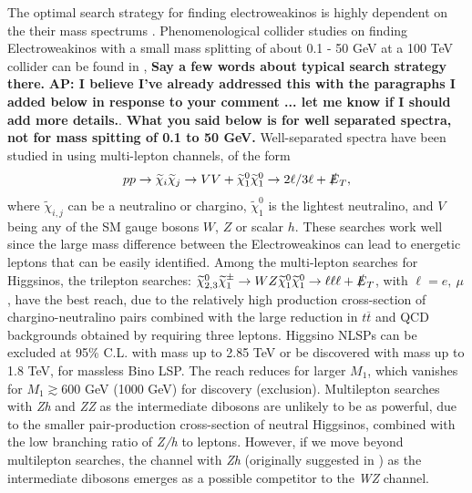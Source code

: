 \documentclass[a4paper,11pt]{article}
\newcommand{\Shufang}[1]{{\bf\color{Maroon}  #1}}
\newcommand{\Adarsh}[1]{{\bf\color{RoyalBlue} AP: #1}}
\newcommand{\met}{{\slashed{E}_T}}
\begin{document}
The optimal search strategy for finding electroweakinos is highly dependent on
the their mass spectrums \citep{Han:2013kza}.  Phenomenological collider studies on finding
Electroweakinos with a small mass splitting of about 0.1 - 50 GeV at a 100 TeV collider can be
found in \citep{Low:2014cba, Bramante:2014tba, Berlin:2015aba, Cirelli:2014dsa},
\Shufang{Say a few words about typical search strategy there.} \Adarsh{I
believe I've already addressed this with the paragraphs I added below in response
to your comment ... let me know if I should add more details.}. \Shufang{What you said below is for well separated spectra, not for mass spitting of 0.1 to 50 GeV.}
Well-separated spectra have been studied in \citep{Gori:2014oua,
Acharya:2014pua} using
multi-lepton channels, of the form 
\begin{align}
  pp\rightarrow \widetilde{\chi}_i\widetilde{\chi}_j\rightarrow VV +
  \widetilde{\chi}_1^0\widetilde{\chi}_1^0\rightarrow 2\ell/3\ell +  
  \met,
\end{align}
where $\widetilde{\chi}_{i,j}$ can be a neutralino or chargino,
$\widetilde{\chi}_1^0$ is the lightest neutralino, and $V$ being any of the SM gauge bosons $W$, $Z$ or scalar $h$.  These searches work well since
the large mass difference between the Electroweakinos can lead to energetic
leptons that can be easily identified. Among the multi-lepton searches for
Higgsinos, the trilepton searches: $\widetilde\chi_{2,3}^0\widetilde\chi_1^\pm\rightarrow WZ\widetilde\chi_1^0\widetilde\chi_1^0\rightarrow \ell\ell\ell + \met$, with $\ell=e, \ \mu$,  have the best reach, due to the relatively high production cross-section of
chargino-neutralino pairs combined with the large reduction in $t\overline{t}$
and QCD backgrounds obtained by requiring three leptons.  Higgsino NLSPs can be excluded at 95\% C.L. with mass up to 2.85 TeV or be discovered with  mass up to 1.8 TeV, for massless Bino LSP.   The reach reduces for larger $M_1$, which vanishes for $M_1\gtrsim 600$ GeV (1000 GeV) for discovery (exclusion).    Multilepton searches
with \emph{Zh} and \emph{ZZ} as the intermediate dibosons are unlikely to be as powerful,
due to the smaller pair-production cross-section of neutral Higgsinos, combined
with the low branching ratio of \emph{Z/h} to leptons. However, if we move beyond
multilepton searches, the channel with \emph{Zh} (originally suggested in
\citep{Han:2013kza}) as the intermediate dibosons emerges as a possible
competitor to the \emph{WZ} channel.  
\end{document}
